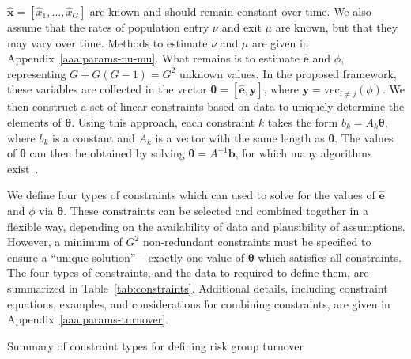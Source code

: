 $\bm{\hat{x}} = [\hat{x}_1, \dots, \hat{x}_G]$
are known and should remain constant over time.
We also assume that the rates of population entry $\nu$ and exit $\mu$
are known, but that they may vary over time.
Methods to estimate $\nu$ and $\mu$ are given in Appendix~\ref{aaa:params-nu-mu}.
What remains is to estimate $\bm{\hat{e}}$ and $\phi$,
representing $G + G(G-1) = G^2$ unknown values.
In the proposed framework,
these variables are collected in the vector
$\bm{\theta} = \left[\bm{\hat{e}}, \bm{y}\right]$,
where $\bm{y} = \mathrm{vec}_{i \ne j}(\phi)$.
We then construct a set of linear constraints based on data
to uniquely determine the elements of $\bm{\theta}$.
Using this approach, each constraint $k$ takes the form
$b_k = A_k \bm{\theta}$,
where $b_k$ is a constant and $A_k$ is a vector with the same length as $\bm{\theta}$.
The values of $\bm{\theta}$ can then be obtained by solving
$\bm{\theta} = A^{-1}\bm{b}$,
for which many algorithms exist~\citep{LAPACK}.
\par
We define four types of constraints which can used to
solve for the values of $\bm{\hat{e}}$ and $\phi$ via $\bm{\theta}$.
These constraints can be selected and combined together in a flexible way,
depending on the availability of data and plausibility of assumptions.
However, a minimum of $G^2$ non-redundant constraints must be specified
to ensure a ``unique solution''
-- exactly one value of $\bm{\theta}$ which satisfies all constraints.
The four types of constraints, and the data to required to define them,
are summarized in Table~\ref{tab:constraints}.
Additional details, including
constraint equations, examples, and considerations for combining constraints,
are given in Appendix~\ref{aaa:params-turnover}.%
\begin{table}
  \centering
  \caption{Summary of constraint types for defining risk group turnover}
  \label{tab:constraints}
  
\end{table}
